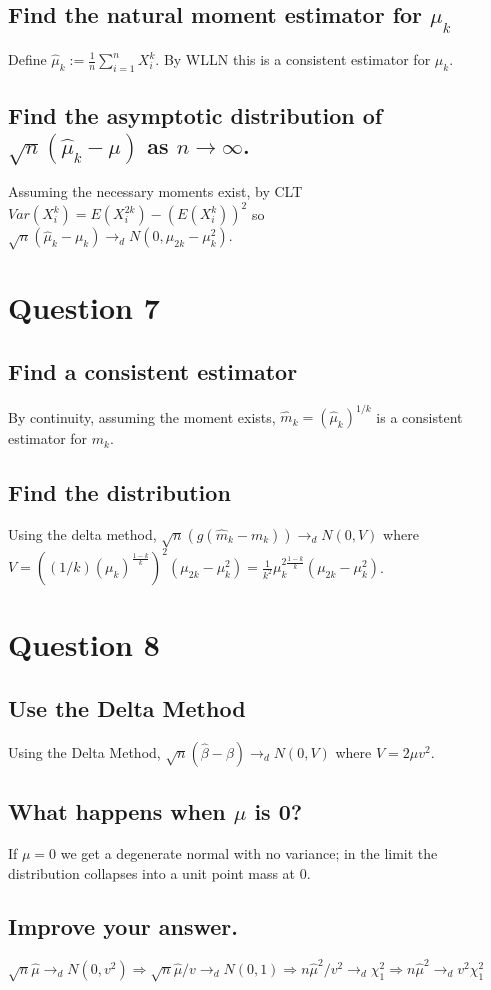 \documentclass[11pt]{article} %
\begin{document}
\subsection{Find the natural moment estimator for $\mu_k$}
Define $\hat{\mu}_k := \frac{1}{n}\sum_{i=1}^nX_i^k.$ By WLLN this is a consistent estimator for $\mu_k$.
\subsection{Find the asymptotic distribution of $\sqrt{n}(\hat{\mu}_k - \mu)$ as $n\rightarrow \infty$.}
Assuming the necessary moments exist, by CLT $Var(X_i^k) = E(X_i^{2k}) - (E(X_i^k))^2$ so \\$\sqrt{n}(\hat{\mu}_k - \mu_k) \rightarrow_d N(0,\mu_{2k} - \mu_k^2)$.

\section{Question 7}
\subsection{Find a consistent estimator}
By continuity, assuming the moment exists, $\hat{m}_k = (\hat{\mu}_k)^{1/k}$ is a consistent estimator for $m_k$.
\subsection{Find the distribution} %
Using the delta method, $\sqrt{n}(g(\hat{m}_k - m_k)) \rightarrow_{d}N(0,V)$ where $V = ((1/k)  (\mu_k)^{\frac{1-k}{k}})^2(\mu_{2k} - \mu_k^2) =\frac{1}{k^2} \mu_k^{2\frac{1-k}{k}}(\mu_{2k} - \mu_k^2 )$.
\section{Question 8}
\subsection{Use the Delta Method}
Using the Delta Method, $\sqrt{n}(\hat{\beta} - \beta) \rightarrow_d N(0,V)$ where $V= 2\mu v^2$.
\subsection{What happens when $\mu$ is 0?}
If $\mu=0$ we get a degenerate normal with no variance; in the limit the distribution collapses into a unit point mass at 0.
\subsection{Improve your answer.} 
$\sqrt{n}\hat{\mu} \rightarrow_d N(0,v^2) \Rightarrow\sqrt{n}\hat{\mu}/v \rightarrow_d N(0,1)  \Rightarrow n\hat{\mu}^2/v^2 \rightarrow_d \chi^2_1  \Rightarrow n\hat{\mu}^2 \rightarrow_d v^2\chi^2_1 $
\end{document}

